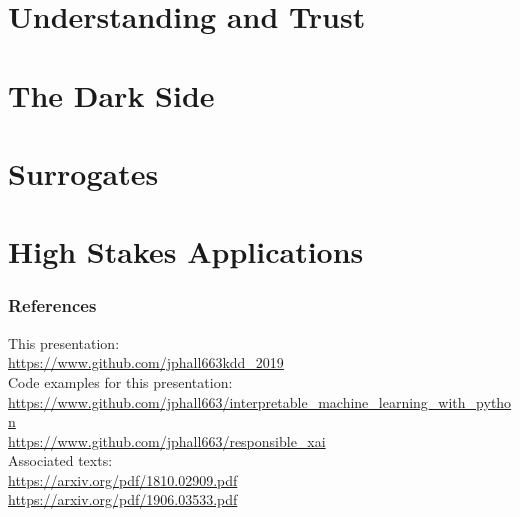 \documentclass[11pt,
               aspectratio=169,
               hyperref={colorlinks}
               ]{beamer}
\begin{document}
	\section{Understanding and Trust}

	\section{The Dark Side}

	\section{Surrogates}

	\section{High Stakes Applications}




	\begin{frame}[t, allowframebreaks]
	
		\frametitle{References}	
		
			This presentation:\\
			\tiny{\url{https://www.github.com/jphall663kdd_2019}}\\
			\vspace{10pt}
			\normalsize Code examples for this presentation:\\
			\tiny{\url{https://www.github.com/jphall663/interpretable_machine_learning_with_python}}\\
			\noindent\tiny{\url{https://www.github.com/jphall663/responsible_xai}}\\
			\vspace{10pt}
			\normalsize Associated texts:\\
			\tiny{\url{https://arxiv.org/pdf/1810.02909.pdf}}\\
			\noindent\tiny{\url{https://arxiv.org/pdf/1906.03533.pdf}}
								
		\framebreak		
		
		\printbibliography
		
	\end{frame}
\end{document}
